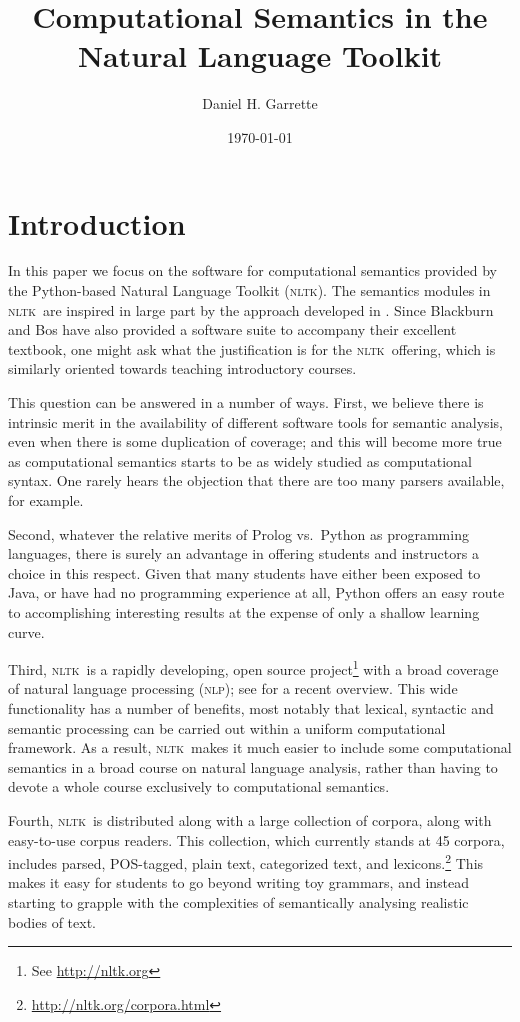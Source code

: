 \documentclass[11pt]{article}
\newcommand{\NLP}{\textsc{nlp}}
\newcommand{\NLTK}{\textsc{nltk}}
\begin{document}
\title{Computational Semantics in the Natural Language Toolkit}
\author{Daniel H. Garrette}
\date{\today}
\maketitle

\section{Introduction}

In this paper we focus on the software for computational semantics provided
by the Python-based Natural Language Toolkit (\NLTK). The semantics
modules in \NLTK\ are
inspired in large part by the approach developed in \citet{BB}.
Since Blackburn and Bos have also provided a software suite to
accompany their excellent textbook, one might ask what the
justification is for the \NLTK\ offering, which is similarly oriented
towards teaching introductory courses.

This question can be answered in a number of ways. First, we believe
there is intrinsic merit in the availability of different
software tools for semantic analysis, even when there is some
duplication of coverage; and this will become more true as
computational semantics starts to be as widely studied as computational
syntax. One rarely hears the objection that there are too many
parsers available, for example. 

Second, whatever the relative merits of Prolog vs.\ Python as
programming languages, there is surely an advantage in offering
students and instructors a choice in this respect. Given that many
students have either been exposed to Java, or have had no programming
experience at all, Python offers an easy route to accomplishing
interesting results at the expense of only a shallow learning curve.

Third, \NLTK\ is a rapidly developing, open source
project\footnote{See \url{http://nltk.org}} with a broad coverage of
natural language processing (\NLP); see \citet{Multidisciplinary} for
a recent overview. This wide functionality has a number of benefits,
most notably that lexical, syntactic and semantic processing can be
carried out within a uniform computational framework. As a result,
\NLTK\ makes it much easier to include some computational semantics in
a broad course on natural language analysis, rather than having to
devote a whole course exclusively to computational semantics.

Fourth, \NLTK\ is distributed along with a
large collection of corpora, along with easy-to-use corpus readers.
This collection, which currently stands at 45 corpora, includes
parsed, POS-tagged, plain text, categorized text, and
lexicons.\footnote{\url{http://nltk.org/corpora.html}} This makes it
easy for students to go beyond writing toy grammars, and instead
starting to grapple with the complexities of semantically analysing
realistic bodies of text.
\end{document}
